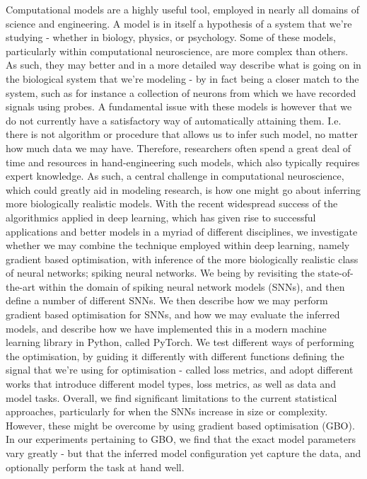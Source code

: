 \documentclass[mphil,deptreport,ianc]{infthesis} %
\begin{document}
\begin{preliminary}
Computational models are a highly useful tool, employed in nearly all domains of science and engineering. A model is in itself a hypothesis of a system that we’re studying - whether in biology, physics, or psychology.
Some of these models, particularly within computational neuroscience, are more complex than others. As such, they may better and in a more detailed way describe what is going on in the biological system that we’re modeling - by in fact being a closer match to the system, such as for instance a collection of neurons from which we have recorded signals using probes.
A fundamental issue with these models is however that we do not currently have a satisfactory way of automatically attaining them. I.e. there is not algorithm or procedure that allows us to infer such model, no matter how much data we may have.
Therefore, researchers often spend a great deal of time and resources in hand-engineering such models, which also typically requires expert knowledge.
As such, a central challenge in computational neuroscience, which could greatly aid in modeling research, is how one might go about inferring more biologically realistic models.
With the recent widespread success of the algorithmics applied in deep learning, which has given rise to successful applications and better models in a myriad of different disciplines, we investigate whether we may combine the technique employed within deep learning, namely gradient based optimisation, with inference of the more biologically realistic class of neural networks; spiking neural networks.
We being by revisiting the state-of-the-art within the domain of spiking neural network models (SNNs), and then define a number of different SNNs. We then describe how we may perform gradient based optimisation for SNNs, and how we may evaluate the inferred models, and describe how we have implemented this in a modern machine learning library in Python, called PyTorch.
We test different ways of performing the optimisation, by guiding it differently with different functions defining the signal that we’re using for optimisation - called loss metrics, and adopt different works that introduce different model types, loss metrics, as well as data and model tasks.
Overall, we find significant limitations to the current statistical approaches, particularly for when the SNNs increase in size or complexity. However, these might be overcome by using gradient based optimisation (GBO). In our experiments pertaining to GBO, we find that the exact model parameters vary greatly - but that the inferred model configuration yet capture the data, and optionally perform the task at hand well.

\end{preliminary}
\end{document}
